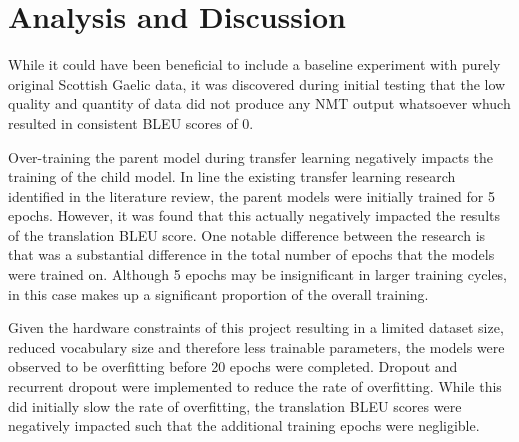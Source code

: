 
\chapter{Analysis and Discussion}

While it could have been beneficial to include a baseline experiment with purely original Scottish Gaelic data, it was discovered during initial testing that the low quality and quantity of data did not produce any \acrshort{NMT} output whatsoever whuch resulted in consistent \acrshort{BLEU} scores of 0.


Over-training the parent model during transfer learning negatively impacts the training of the child model. In line the existing transfer learning research identified in the literature review, the parent models were initially trained for 5 epochs. However, it was found that this actually negatively impacted the results of the translation BLEU score. One notable difference between the research is that was a substantial difference in the total number of epochs that the models were trained on. Although 5 epochs may be insignificant in larger training cycles, in this case makes up a significant proportion of the overall training.


Given the hardware constraints of this project resulting in a limited dataset size, reduced vocabulary size and therefore less trainable parameters, the models were observed to be overfitting before 20 epochs were completed. Dropout and recurrent dropout were implemented to reduce the rate of overfitting. While this did initially slow the rate of overfitting, the translation \acrshort{BLEU} scores were negatively impacted such that the additional training epochs were negligible.